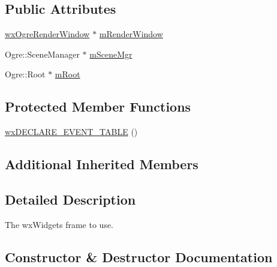 \subsection*{Public Attributes}
\begin{DoxyCompactItemize}
\item 
\mbox{\hyperlink{classwx_ogre_render_window}{wx\+Ogre\+Render\+Window}} $\ast$ \mbox{\hyperlink{class_rad_j_a_v_1_1_g_u_i_1_1_canvas3_d_frame_adbdd4bfa275afbc804822984f31bb882}{m\+Render\+Window}}
\item 
Ogre\+::\+Scene\+Manager $\ast$ \mbox{\hyperlink{class_rad_j_a_v_1_1_g_u_i_1_1_canvas3_d_frame_a7b18d618a08c9f13998ef40433d9b908}{m\+Scene\+Mgr}}
\item 
Ogre\+::\+Root $\ast$ \mbox{\hyperlink{class_rad_j_a_v_1_1_g_u_i_1_1_canvas3_d_frame_a851e6cd47573541967fd2c33ce2a18aa}{m\+Root}}
\end{DoxyCompactItemize}
\subsection*{Protected Member Functions}
\begin{DoxyCompactItemize}
\item 
\mbox{\hyperlink{class_rad_j_a_v_1_1_g_u_i_1_1_canvas3_d_frame_a0673607624cb94ec5df69f1e1e8f777a}{wx\+D\+E\+C\+L\+A\+R\+E\+\_\+\+E\+V\+E\+N\+T\+\_\+\+T\+A\+B\+LE}} ()
\end{DoxyCompactItemize}
\subsection*{Additional Inherited Members}


\subsection{Detailed Description}
The wx\+Widgets frame to use. 

\subsection{Constructor \& Destructor Documentation}
\mbox{\label{class_rad_j_a_v_1_1_g_u_i_1_1_canvas3_d_frame_a1eaab2549313e864358c748f0c0b8669}} 
